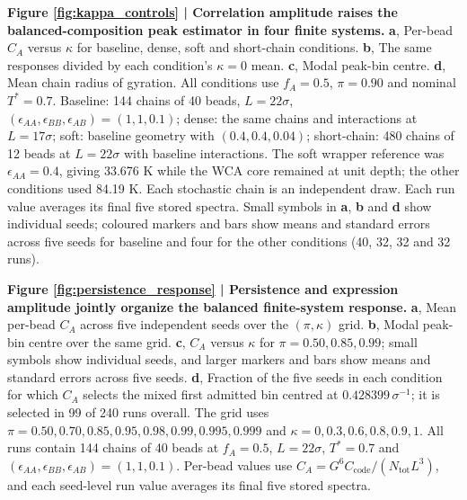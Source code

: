 \documentclass[pdflatex,sn-nature,onecolumn]{sn-jnl}
\begin{document}
\medskip
\noindent\textbf{Figure \ref{fig:kappa_controls} | Correlation amplitude raises the balanced-composition peak estimator in four finite systems.} \textbf{a}, Per-bead $C_A$ versus $\kappa$ for baseline, dense, soft and short-chain conditions. \textbf{b}, The same responses divided by each condition's $\kappa=0$ mean. \textbf{c}, Modal peak-bin centre. \textbf{d}, Mean chain radius of gyration. All conditions use $f_A=0.5$, $\pi=0.90$ and nominal $T^*=0.7$. Baseline: 144 chains of 40 beads, $L=22\sigma$, $(\epsilon_{AA},\epsilon_{BB},\epsilon_{AB})=(1,1,0.1)$; dense: the same chains and interactions at $L=17\sigma$; soft: baseline geometry with $(0.4,0.4,0.04)$; short-chain: 480 chains of 12 beads at $L=22\sigma$ with baseline interactions. The soft wrapper reference was $\epsilon_{AA}=0.4$, giving 33.676 K while the WCA core remained at unit depth; the other conditions used 84.19 K. Each stochastic chain is an independent draw. Each run value averages its final five stored spectra. Small symbols in \textbf{a}, \textbf{b} and \textbf{d} show individual seeds; coloured markers and bars show means and standard errors across five seeds for baseline and four for the other conditions (40, 32, 32 and 32 runs).

\medskip
\noindent\textbf{Figure \ref{fig:persistence_response} | Persistence and expression amplitude jointly organize the balanced finite-system response.} \textbf{a}, Mean per-bead $C_A$ across five independent seeds over the $(\pi,\kappa)$ grid. \textbf{b}, Modal peak-bin centre over the same grid. \textbf{c}, $C_A$ versus $\kappa$ for $\pi=0.50,0.85,0.99$; small symbols show individual seeds, and larger markers and bars show means and standard errors across five seeds. \textbf{d}, Fraction of the five seeds in each condition for which $C_A$ selects the mixed first admitted bin centred at $0.428399\,\sigma^{-1}$; it is selected in 99 of 240 runs overall. The grid uses $\pi=0.50,0.70,0.85,0.95,0.98,0.99,0.995,0.999$ and $\kappa=0,0.3,0.6,0.8,0.9,1$. All runs contain 144 chains of 40 beads at $f_A=0.5$, $L=22\sigma$, $T^*=0.7$ and $(\epsilon_{AA},\epsilon_{BB},\epsilon_{AB})=(1,1,0.1)$. Per-bead values use $C_A=G^6C_{\mathrm{code}}/(N_{\mathrm{tot}}L^3)$, and each seed-level run value averages its final five stored spectra.
\end{document}
